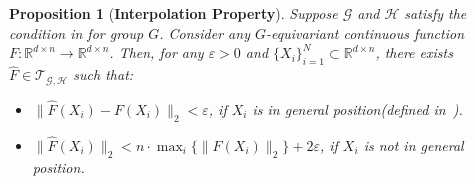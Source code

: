 \documentclass{article}
\newtheorem{proposition}{Proposition}
\newcommand{\lt}[1]{{\footnotesize\textcolor{cyan!60!black}{\tt TL: #1}}}
\begin{document}
\begin{proposition}[\textbf{Interpolation Property}]
    \label{prop:interpolation}
 Suppose $\mathcal G$ and $\mathcal H$ satisfy the condition in  for group $G$.
 Consider any $G$-equivariant continuous function $F:\mathbb R^{d\times n}\to\mathbb R^{d\times n}$.
 Then, for any $\varepsilon >0$ and $\{X_i\}_{i=1}^N\subset \mathbb R^{d\times n}$, there exists $\hat F\in \mathcal T_{\mathcal G, \mathcal H}$ such that:
 \begin{itemize}
    \item  $\|\hat F(X_i)-F(X_i)\|_2<\varepsilon$, if $X_i$ is in general position(defined in~). 
    \item $\displaystyle\|\hat F(X_i)\|_2< n\cdot \max_{i}\{\|F(X_i)\|_2\} + 2 \varepsilon$, if $X_i$ is not in general position.
 \end{itemize}
\end{proposition}
\end{document}
